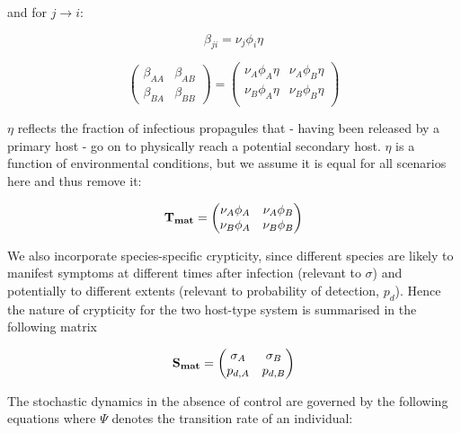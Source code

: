 \documentclass[11pt,letterpaper]{article}
\begin{document}
and for $j \rightarrow i$:

\begin{equation}
\beta_{ji}= \nu_{j} \phi_{i} \eta
\end{equation}



\begin{equation}
    \begin{pmatrix}
\beta_{AA} & \beta_{AB} \\
\beta_{BA} & \beta_{BB}
 
\end{pmatrix} = 
\begin{pmatrix}
\nu_{A} \phi_{A} \eta & \nu_{A} \phi_{B} \eta \\
\nu_{B} \phi_{A} \eta & \nu_{B} \phi_{B} \eta \\
\end{pmatrix}
\end{equation}

$\eta$ reflects the fraction of infectious propagules that - having been released by a primary host - go on to physically reach a potential secondary host. $\eta$ is a function of environmental conditions, but we assume it is equal for all scenarios here and thus remove it: 

\begin{equation}
\label{nuphi}
   \bf{T_{mat}} = 
\begin{pmatrix}
\nu_{A} \phi_{A} & \nu_{A} \phi_{B} \\
\nu_{B} \phi_{A} & \nu_{B} \phi_{B} \\
\end{pmatrix}
\end{equation}

We also incorporate species-specific crypticity, since different species are likely to manifest symptoms at different times after infection (relevant to $\sigma$) and potentially to different extents (relevant to probability of detection, $p_d$). Hence the nature of crypticity for the two host-type system is summarised in the following matrix

\begin{equation}
   \bf{S_{mat}} = 
\begin{pmatrix}
\sigma_{A} & \sigma_{B} \\
p_{d,A} & p_{d,B}\\
\end{pmatrix}
\end{equation}

The stochastic dynamics in the absence of control are governed by the following equations where $\Psi$ denotes the transition rate of an individual:
\end{document}
